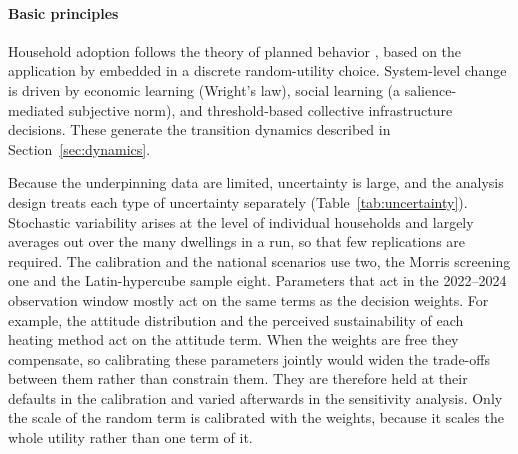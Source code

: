 \documentclass[preprint,12pt,authoryear]{elsarticle}
\begin{document}
\paragraph{Basic principles}
Household adoption follows the theory of planned behavior
\citep{ajzenTheoryPlannedBehavior1991}, based on the application by \citet{okurAdoptionRenewableHeating2024} embedded in a discrete
random-utility choice. System-level change is driven by economic learning
(Wright's law), social learning (a salience-mediated subjective norm), and
threshold-based collective infrastructure decisions. These generate the
transition dynamics described in Section~\ref{sec:dynamics}.

Because the underpinning data are limited, uncertainty is large, and the
analysis design treats each type of uncertainty separately
(Table~\ref{tab:uncertainty}). Stochastic variability arises at the level of
individual households and largely averages out over the many dwellings in a
run, so that few replications are required. The calibration and the national
scenarios use two, the Morris screening one and the Latin-hypercube sample
eight. Parameters that act in the 2022--2024 observation window mostly act on
the same terms as the decision weights. For example, the attitude
distribution and the perceived sustainability of each heating method act on
the attitude term. When the weights are free they compensate, so calibrating
these parameters jointly would widen the trade-offs between them rather than
constrain them. They are therefore held at their defaults in the calibration
and varied afterwards in the sensitivity analysis. Only the scale of the
random term is calibrated with the weights, because it scales the whole
utility rather than one term of it.
\end{document}
